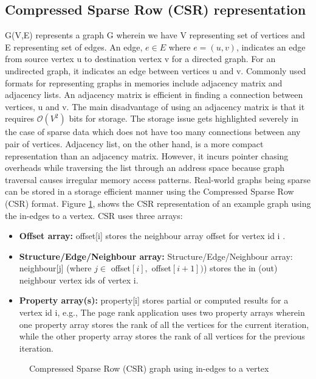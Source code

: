 \documentclass[a4paper,12pt, final]{report}
\begin{document}
\subsection{Compressed Sparse Row (CSR) representation}
G(V,E) represents a graph G wherein we have V representing set of vertices and E
representing set of edges. An edge, $e \in E$ where $e=(u,v)$, indicates an edge from
source vertex u to destination vertex v for a directed graph. For an undirected graph,
it indicates an edge between vertices u and v. Commonly used formats for representing
graphs in memories include adjacency matrix and adjacency lists. An adjacency matrix
is efficient in finding a connection between vertices, u and v. The main disadvantage
of using an adjacency matrix is that it requires $\mathcal{O}(V^2)$ bits for storage. The storage
issue gets highlighted severely in the case of sparse data which does not have too many
connections between any pair of vertices. Adjacency list, on the other hand, is a more
compact representation than an adjacency matrix. However, it incurs pointer chasing
overheads while traversing the list through an address space because graph traversal
causes irregular memory access patterns.
Real-world graphs being sparse can be stored in a storage efficient manner using the
Compressed Sparse Row (CSR) format. Figure \ref{fig:CSR}, shows the CSR representation of
an example graph using the in-edges to a vertex. CSR uses three arrays:

\begin{itemize}
    \setlength\itemsep{0 em}
    \item \textbf{Offset array:} offset[i] stores the neighbour array offset for vertex id i .
    \item \textbf{Structure/Edge/Neighbour array:} Structure/Edge/Neighbour array: neighbour[j] (where $j \in$ offset$[i], $ offset$[i+1])$) stores the in (out) neighbour vertex ids of vertex i.
    \item \textbf{Property array(s):} property[i] stores partial or computed results for a vertex id i, e.g., The page rank application uses two property arrays wherein one property array stores the rank of all the vertices for the current iteration, while the other property array stores the rank of all vertices for the previous iteration.
\end{itemize}


\begin{figure}[h]
    \centering
    
    \caption{Compressed Sparse Row (CSR) graph using in-edges to a vertex}
    \label{fig:CSR}
\end{figure}
\end{document}
